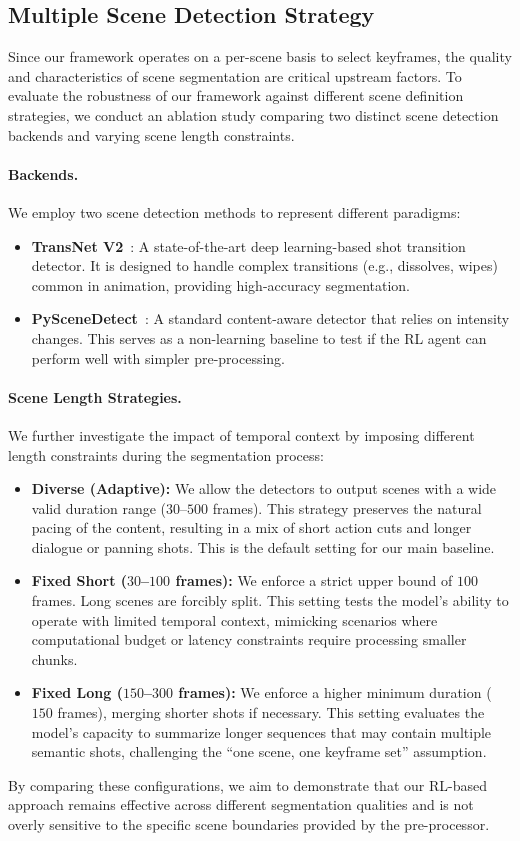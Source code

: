 \subsection{Multiple Scene Detection Strategy}
\label{subsec:scene_detection_strategy}

Since our framework operates on a per-scene basis to select keyframes, the quality and characteristics of scene segmentation are critical upstream factors. To evaluate the robustness of our framework against different scene definition strategies, we conduct an ablation study comparing two distinct scene detection backends and varying scene length constraints.

\paragraph{Backends.} We employ two scene detection methods to represent different paradigms:
\begin{itemize}
    \item \textbf{TransNet V2}~\cite{soucek2020transnet}: A state-of-the-art deep learning-based shot transition detector. It is designed to handle complex transitions (e.g., dissolves, wipes) common in animation, providing high-accuracy segmentation.
    \item \textbf{PySceneDetect}~\cite{pyscenedetect}: A standard content-aware detector that relies on intensity changes. This serves as a non-learning baseline to test if the RL agent can perform well with simpler pre-processing.
\end{itemize}

\paragraph{Scene Length Strategies.} We further investigate the impact of temporal context by imposing different length constraints during the segmentation process:
\begin{itemize}
    \item \textbf{Diverse (Adaptive):} We allow the detectors to output scenes with a wide valid duration range ($30$--$500$ frames). This strategy preserves the natural pacing of the content, resulting in a mix of short action cuts and longer dialogue or panning shots. This is the default setting for our main baseline.
    \item \textbf{Fixed Short ($30$--$100$ frames):} We enforce a strict upper bound of $100$ frames. Long scenes are forcibly split. This setting tests the model's ability to operate with limited temporal context, mimicking scenarios where computational budget or latency constraints require processing smaller chunks.
    \item \textbf{Fixed Long ($150$--$300$ frames):} We enforce a higher minimum duration ($150$ frames), merging shorter shots if necessary. This setting evaluates the model's capacity to summarize longer sequences that may contain multiple semantic shots, challenging the ``one scene, one keyframe set'' assumption.
\end{itemize}

By comparing these configurations, we aim to demonstrate that our RL-based approach remains effective across different segmentation qualities and is not overly sensitive to the specific scene boundaries provided by the pre-processor.
